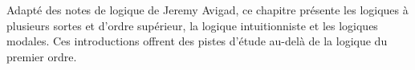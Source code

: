 \documentclass[../../../include/open-logic-chapter]{subfiles}
\begin{document}

Adapté des notes de logique de Jeremy Avigad, ce chapitre présente
les logiques à plusieurs sortes et d'ordre supérieur, la logique
intuitionniste et les logiques modales. Ces introductions offrent
des pistes d'étude au-delà de la logique du premier ordre.








\OLEndChapterHook
\end{document}
